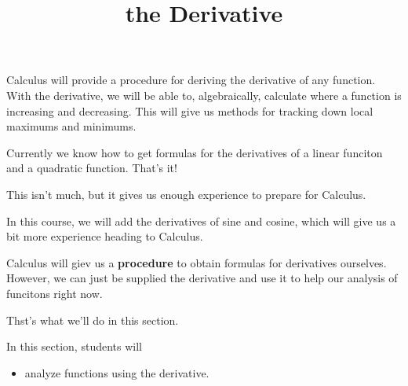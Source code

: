 \documentclass{ximera}
\title{the Derivative}
\begin{document}
\begin{abstract}
%
\end{abstract}
\maketitle




Calculus will provide a procedure for deriving the derivative of any function.  With the derivative, we will be able to, algebraically, calculate where a function is increasing and decreasing.  This will give us methods for tracking down local maximums and minimums.


Currently we know how to get formulas for the derivatives of a linear funciton and a quadratic function.  That's it! 

This isn't much, but it gives us enough experience to prepare for Calculus.


In this course, we will add the derivatives of sine and cosine, which will give us a bit more experience heading to Calculus.


Calculus will giev us a \textbf{\textcolor{blue!55!black}{procedure}} to obtain formulas for derivatives ourselves.  However, we can just be supplied the derivative and use it to help our analysis of funcitons right now.


Thst's what we'll do in this section.








\begin{sectionOutcomes}
In this section, students will 

\begin{itemize}
\item analyze functions using the derivative.
\end{itemize}
\end{sectionOutcomes}
\end{document}
